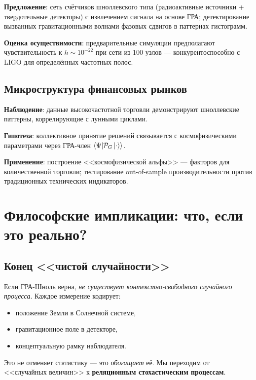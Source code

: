 \documentclass[12pt,a4paper]{article}
\theoremstyle{plain}
\theoremstyle{definition}
\theoremstyle{remark}
\newcommand{\cP}{\mathcal{P}}
\newcommand{\inner}[2]{\left\langle #1 \middle| #2 \right\rangle}
\begin{document}
\textbf{Предложение}: сеть счётчиков шноллевского типа (радиоактивные источники + твердотельные детекторы) с извлечением сигнала на основе ГРА; детектирование вызванных гравитационными волнами фазовых сдвигов в паттернах гистограмм.

\textbf{Оценка осуществимости}: предварительные симуляции предполагают чувствительность к $h \sim 10^{-22}$ при сети из 100 узлов --- конкурентоспособно с LIGO для определённых частотных полос.

\subsection{Микроструктура финансовых рынков}
\textbf{Наблюдение}: данные высокочастотной торговли демонстрируют шноллевские паттерны, коррелирующие с лунными циклами.

\textbf{Гипотеза}: коллективное принятие решений связывается с космофизическими параметрами через ГРА-член $\inner{\Psi}{\cP_G \ket{\cdot}}$.

\textbf{Применение}: построение <<космофизической альфы>> --- факторов для количественной торговли; тестирование out-of-sample производительности против традиционных технических индикаторов.

\section{Философские импликации: что, если это реально?}
\label{sec:philosophy}

\subsection{Конец <<чистой случайности>>}
Если ГРА-Шноль верна, \emph{не существует контекстно-свободного случайного процесса}. Каждое измерение кодирует:
\begin{itemize}
    \item положение Земли в Солнечной системе,
    \item гравитационное поле в детекторе,
    \item концептуальную рамку наблюдателя.
\end{itemize}
Это не отменяет статистику --- это \emph{обогащает} её. Мы переходим от <<случайных величин>> к \textbf{реляционным стохастическим процессам}.
\end{document}
